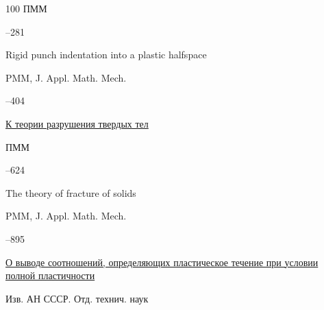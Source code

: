 \begin{thebibliography}{100}
\jour ПММ




–281


\transl


\paper Rigid punch indentation into a plastic halfspace

\jour PMM, J. Appl. Math. Mech.


--404 








\paper \href{https://zbmath.org/?q=an:0097.17604}{К теории разрушения твердых тел}

\jour ПММ




–624


\transl


\paper The theory of fracture of solids

\jour PMM, J. Appl. Math. Mech. 


--895 






\paper \href{https://zbmath.org/?q=an:0101.17205}{О выводе соотношений, определяющих пластическое течение при условии полной пластичности}

\jour Изв. АН СССР. Отд. технич. наук








\end{thebibliography}
